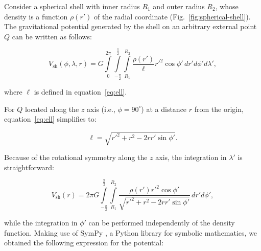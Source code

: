 \documentclass[extra, referee]{gji}
\begin{document}
Consider a spherical shell with inner radius $R_1$ and outer radius $R_2$,
whose density is a function $\rho(r')$ of the radial coordinate
(Fig.~\ref{fig:spherical-shell}).
The gravitational potential generated by the shell on an arbitrary external
point $Q$ can be written as follows:

\begin{equation}
    V_\text{sh}(\phi, \lambda, r) = G
    \int\limits_0^{2\pi}
    \int\limits_{-\frac{\pi}{2}}^\frac{\pi}{2}
    \int\limits_{R_1}^{R_2}
    \frac{\rho(r')}{\ell} {r'}^2 \cos\phi' \,
    dr' d\phi' d\lambda',
\end{equation}

\noindent where $\ell$ is defined in equation~\ref{eq:ell}.

For $Q$ located along the $z$ axis (i.e., $\phi=90^\circ$) at a distance $r$ from the
origin, equation~\ref{eq:ell} simplifies to:

\begin{equation}
    \ell = \sqrt{r'^2 + r^2 - 2 r r' \sin\phi'}.
\end{equation}

\noindent
Because of the rotational symmetry along the $z$ axis, the integration in $\lambda'$ is
straightforward:

\begin{equation}
    V_\text{sh}(r) = 2\pi G
    \int\limits_{-\frac{\pi}{2}}^\frac{\pi}{2}
    \int\limits_{R_1}^{R_2}
    \frac{\rho(r') {r'}^2 \cos\phi'}{\sqrt{r'^2 + r^2 - 2 r r' \sin\phi'}}
    \, dr' d\phi',
\end{equation}

\noindent
while the integration in $\phi'$ can be performed independently of the density function.
Making use of SymPy \citep{sympy2017}, a Python library for symbolic mathematics, we
obtained the following expression for the potential:

\end{document}
